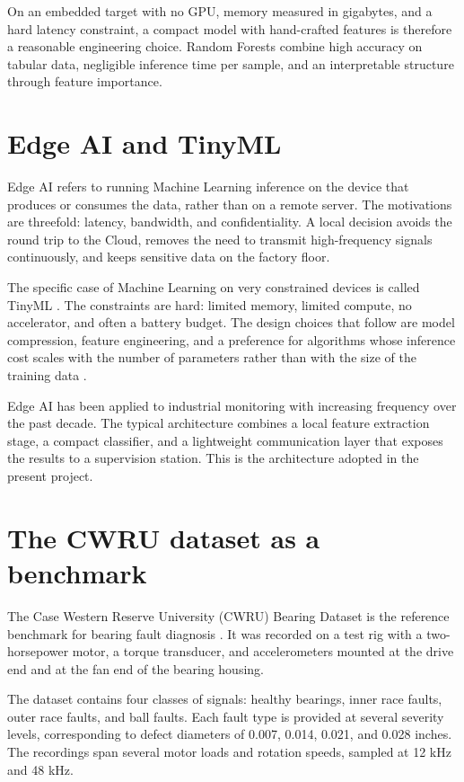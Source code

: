 On an embedded target with no GPU, memory measured in gigabytes, and a hard latency constraint, a compact model with hand-crafted features is therefore a reasonable engineering choice. Random Forests \cite{breiman2001random} combine high accuracy on tabular data, negligible inference time per sample, and an interpretable structure through feature importance.

\section{Edge AI and TinyML}

Edge AI refers to running Machine Learning inference on the device that produces or consumes the data, rather than on a remote server. The motivations are threefold: latency, bandwidth, and confidentiality. A local decision avoids the round trip to the Cloud, removes the need to transmit high-frequency signals continuously, and keeps sensitive data on the factory floor.

The specific case of Machine Learning on very constrained devices is called TinyML \cite{dutta2021tinyml}. The constraints are hard: limited memory, limited compute, no accelerator, and often a battery budget. The design choices that follow are model compression, feature engineering, and a preference for algorithms whose inference cost scales with the number of parameters rather than with the size of the training data \cite{banbury2021mlperf}.

Edge AI has been applied to industrial monitoring with increasing frequency over the past decade. The typical architecture combines a local feature extraction stage, a compact classifier, and a lightweight communication layer that exposes the results to a supervision station. This is the architecture adopted in the present project.

\section{The CWRU dataset as a benchmark}

The Case Western Reserve University (CWRU) Bearing Dataset is the reference benchmark for bearing fault diagnosis \cite{smith2015rolling}. It was recorded on a test rig with a two-horsepower motor, a torque transducer, and accelerometers mounted at the drive end and at the fan end of the bearing housing.

The dataset contains four classes of signals: healthy bearings, inner race faults, outer race faults, and ball faults. Each fault type is provided at several severity levels, corresponding to defect diameters of 0.007, 0.014, 0.021, and 0.028 inches. The recordings span several motor loads and rotation speeds, sampled at 12 kHz and 48 kHz.

